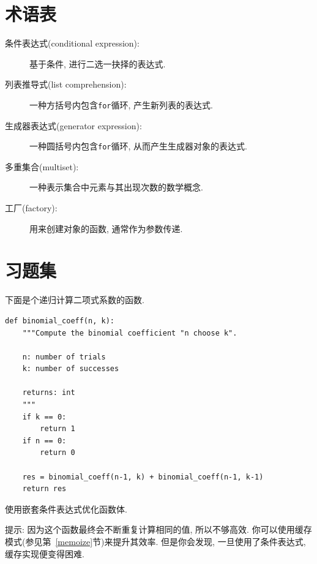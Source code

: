 \documentclass[10pt]{book}
\begin{document}
\section{术语表}

\begin{description}

\item[条件表达式(conditional expression):] 基于条件, 进行二选一抉择的表达式.

\item[列表推导式(list comprehension):] 一种方括号内包含{\tt for}循环, 产生新列表的表达式.

\item[生成器表达式(generator expression):] 一种圆括号内包含{\tt for}循环, 
从而产生生成器对象的表达式.  

\item[多重集合(multiset):] 一种表示集合中元素与其出现次数的数学概念.

\item[工厂(factory):] 用来创建对象的函数, 通常作为参数传递. 

\end{description}




\section{习题集}

\begin{exercise}

下面是个递归计算二项式系数的函数.

\begin{verbatim}
def binomial_coeff(n, k):
    """Compute the binomial coefficient "n choose k".

    n: number of trials
    k: number of successes

    returns: int
    """
    if k == 0:
        return 1
    if n == 0:
        return 0

    res = binomial_coeff(n-1, k) + binomial_coeff(n-1, k-1)
    return res
\end{verbatim}

使用嵌套条件表达式优化函数体.

提示: 因为这个函数最终会不断重复计算相同的值, 所以不够高效. 
你可以使用缓存模式(参见第~\ref{memoize}节)来提升其效率. 
但是你会发现, 一旦使用了条件表达式, 缓存实现便变得困难. 
\end{exercise}
\end{document}
